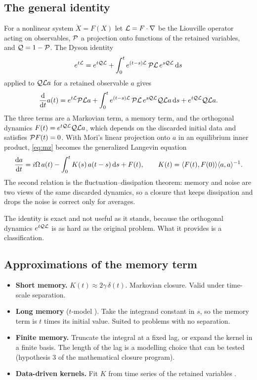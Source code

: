 \subsection{The general identity}

For a nonlinear system $\dot X=F(X)$ let $\mathcal{L}=F\cdot\nabla$ be the
Liouville operator acting on observables, $\mathcal{P}$ a projection onto functions
of the retained variables, and $\mathcal{Q}=1-\mathcal{P}$. The Dyson identity
\[
  e^{t\mathcal{L}}=e^{t\mathcal{Q}\mathcal{L}}+\int_0^te^{(t-s)\mathcal{L}}\,\mathcal{P}\mathcal{L}\,e^{s\mathcal{Q}\mathcal{L}}\,\mathrm{d} s
\]
applied to $\mathcal{Q}\mathcal{L} a$ for a retained observable $a$ gives
\begin{equation}
  \frac{\mathrm{d}}{\mathrm{d} t}a(t)=e^{t\mathcal{L}}\mathcal{P}\mathcal{L} a
    +\int_0^te^{(t-s)\mathcal{L}}\,\mathcal{P}\mathcal{L}\,e^{s\mathcal{Q}\mathcal{L}}\mathcal{Q}\mathcal{L} a\,\mathrm{d} s
    +e^{t\mathcal{Q}\mathcal{L}}\mathcal{Q}\mathcal{L} a .
  \label{eq:mz}
\end{equation}
The three terms are a Markovian term, a memory term, and the
orthogonal dynamics $F(t)=e^{t\mathcal{Q}\mathcal{L}}\mathcal{Q}\mathcal{L} a$, which depends on the
discarded initial data and satisfies $\mathcal{P} F(t)=0$. With Mori's linear
projection onto $a$ in an equilibrium inner product, \eqref{eq:mz} becomes
the generalized Langevin equation
\begin{equation}
  \frac{\mathrm{d} a}{\mathrm{d} t}=i\Omega\,a(t)-\int_0^tK(s)\,a(t-s)\,\mathrm{d} s+F(t),
  \qquad
  K(t)=\langle F(t),F(0) \rangle\langle a,a \rangle^{-1} .
  \label{eq:gle}
\end{equation}
The second relation is the fluctuation--dissipation theorem: memory and
noise are two views of the same discarded dynamics, so a closure that keeps
dissipation and drops the noise is correct only for averages.

The identity is exact and not useful as it stands, because the orthogonal
dynamics $e^{t\mathcal{Q}\mathcal{L}}$ is as hard as the original problem. What it provides
is a classification.

\subsection{Approximations of the memory term}

\begin{itemize}
  \item \textbf{Short memory.} $K(t)\approx2\gamma\,\delta(t)$. Markovian
    closure. Valid under time-scale separation.
  \item \textbf{Long memory} ($t$-model \cite{ChorinHaldKupferman02}). Take
    the integrand constant in $s$, so the memory term is $t$ times its
    initial value. Suited to problems with no separation.
  \item \textbf{Finite memory.} Truncate the integral at a fixed lag, or
    expand the kernel in a finite basis. The length of the lag is a
    modelling choice that can be tested (hypothesis 3 of the mathematical
    closure program).
  \item \textbf{Data-driven kernels.} Fit $K$ from time series of the
    retained variables \cite{Lin21}.
\end{itemize}

